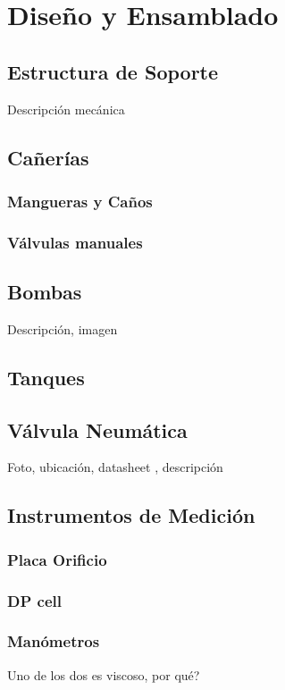\chapter{Diseño y Ensamblado}
\label{ch:DisenoEnsamblado}

\section{Estructura de Soporte}
\label{sec:EstructuraSoporte}
Descripción mecánica

\section{Cañerías}
\label{sec:Canerias}
\subsection{Mangueras y Caños}
\subsection{Válvulas manuales}

\section{Bombas}
\label{sec:Bombas}
Descripción, imagen

\section{Tanques}
\label{sec:Tanques}

\section{Válvula Neumática}
\label{sec:ValvulaNeumatica}
Foto, ubicación, datasheet , descripción

\section{Instrumentos de Medición}
\label{sec:InstrumentosMedicion}
\subsection{Placa Orificio}
\label{subsec:PlacaOrificio}

\subsection{DP cell}
\label{subsec:DPCell}

\subsection{Manómetros}
\label{subsec:Manometros}
Uno de los dos es viscoso, por qué? 
